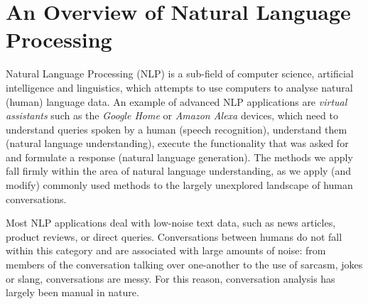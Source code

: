 \section{An Overview of Natural Language Processing \label{sec: nlp}}

Natural Language Processing (NLP) is a sub-field of computer science, artificial intelligence and linguistics, which attempts to use computers to analyse natural (human) language data. An example of advanced NLP applications are \textit{virtual assistants} such as the \textit{Google Home} or \textit{Amazon Alexa} devices, which need to understand queries spoken by a human (speech recognition), understand them (natural language understanding), execute the functionality that was asked for and formulate a response (natural language generation). The methods we apply fall firmly within the area of natural language understanding, as we apply (and modify) commonly used methods to the largely unexplored landscape of human conversations.


Most NLP applications deal with low-noise text data, such as news articles, product reviews, or direct queries. Conversations between humans do not fall within this category and are associated with large amounts of noise: from members of the conversation talking over one-another to the use of sarcasm, jokes or slang, conversations are messy. For this reason, conversation analysis has largely been manual in nature.